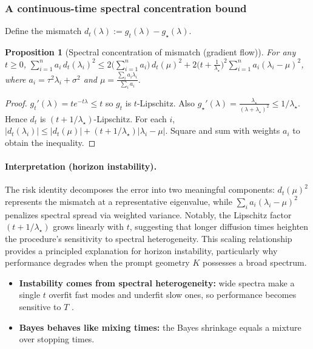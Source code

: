 \documentclass{article}
\theoremstyle{plain}
\newtheorem{proposition}[theorem]{Proposition}
\theoremstyle{definition}
\theoremstyle{remark}
\begin{document}
\subsubsection{A continuous-time spectral concentration bound}
Define the mismatch $d_t(\lambda):=g_t(\lambda)-g_\star(\lambda)$.
\begin{proposition}[Spectral concentration of mismatch (gradient flow)]
\label{prop:app_gf_concentration_short}
For any $t\ge 0$,
$\sum_{i=1}^n a_i\,d_t(\lambda_i)^2 \le 2\Big(\sum_{i=1}^n a_i\Big)\,d_t(\mu)^2 + 2\Big(t+\frac{1}{\lambda_\star}\Big)^2\sum_{i=1}^n a_i(\lambda_i-\mu)^2$, where $a_i=\tau^2\lambda_i+\sigma^2$ and $\mu=\frac{\sum_i a_i\lambda_i}{\sum_i a_i}$.
\end{proposition}
\begin{proof}
$g_t'(\lambda)=t e^{-t\lambda}\le t$ so $g_t$ is $t$-Lipschitz.
Also $g_\star'(\lambda)=\frac{\lambda_\star}{(\lambda+\lambda_\star)^2}\le 1/\lambda_\star$.
Hence $d_t$ is $(t+1/\lambda_\star)$-Lipschitz.
For each $i$, $|d_t(\lambda_i)|\le |d_t(\mu)|+(t+1/\lambda_\star)|\lambda_i-\mu|$.
Square and sum with weights $a_i$ to obtain the inequality.
\end{proof}

\paragraph{Interpretation (horizon instability).}
The risk identity decomposes the error into two meaningful components: $d_t(\mu)^2$ represents the mismatch at a representative eigenvalue, while $\sum_i a_i(\lambda_i-\mu)^2$ penalizes spectral spread via weighted variance. Notably, the Lipschitz factor $(t+1/\lambda_\star)$ grows linearly with $t$, suggesting that longer diffusion times heighten the procedure's sensitivity to spectral heterogeneity. This scaling relationship provides a principled explanation for horizon instability, particularly why performance degrades when the prompt geometry $K$ possesses a broad spectrum.


\begin{takeawaybox}[title=\textbf{Summary: Why $T$ is prompt-dependent (diffusion intuition)}]
\begin{itemize}[leftmargin=*, itemsep=0pt, topsep=0pt]
\item \textbf{Instability comes from spectral heterogeneity:} wide spectra make a single $t$ overfit fast modes and underfit slow ones, so performance becomes sensitive to $T$ .
\item \textbf{Bayes behaves like mixing times:} the Bayes shrinkage equals a mixture over stopping times.
\end{itemize}
\end{takeawaybox}
\end{document}
